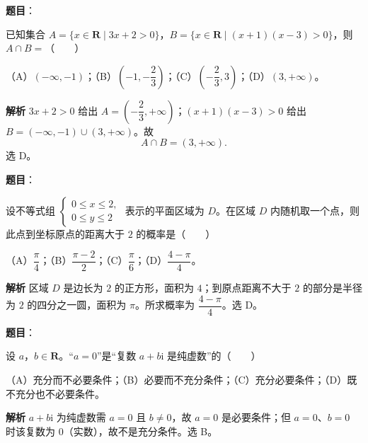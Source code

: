 
\begin{answer}

\textbf{题目}：

已知集合 $A=\{x\in\mathbf R\mid3x+2>0\}$，$B=\{x\in\mathbf R\mid(x+1)(x-3)>0\}$，则 $A\cap B=$\mbox{（　　）}

（A）$(-\infty,-1)$；（B）$\left(-1,-\dfrac23\right)$；（C）$\left(-\dfrac23,3\right)$；（D）$(3,+\infty)$。

\textbf{解析}
$3x+2>0$ 给出 $A=\left(-\dfrac23,+\infty\right)$；$(x+1)(x-3)>0$ 给出 $B=(-\infty,-1)\cup(3,+\infty)$。故
\nopagebreak[4]
\[A\cap B=(3,+\infty).\]
选 D。


\end{answer}
\begin{answer}

\textbf{题目}：

设不等式组 $\begin{cases}0\leqslant x\leqslant2,\\0\leqslant y\leqslant2\end{cases}$ 表示的平面区域为 $D$。在区域 $D$ 内随机取一个点，则此点到坐标原点的距离大于 $2$ 的概率是\mbox{（　　）}

（A）$\dfrac\pi4$；（B）$\dfrac{\pi-2}2$；（C）$\dfrac\pi6$；（D）$\dfrac{4-\pi}4$。

\textbf{解析}
区域 $D$ 是边长为 $2$ 的正方形，面积为 $4$；到原点距离不大于 $2$ 的部分是半径为 $2$ 的四分之一圆，面积为 $\pi$。所求概率为 $\dfrac{4-\pi}4$。选 D。


\end{answer}
\begin{answer}

\textbf{题目}：

设 $a$，$b\in\mathbf R$。“$a=0$”是“复数 $a+b\mathrm i$ 是纯虚数”的\mbox{（　　）}

（A）充分而不必要条件；（B）必要而不充分条件；（C）充分必要条件；（D）既不充分也不必要条件。

\textbf{解析}
$a+b\mathrm i$ 为纯虚数需 $a=0$ 且 $b\neq0$，故 $a=0$ 是必要条件；但 $a=0$、$b=0$ 时该复数为 $0$（实数），故不是充分条件。选 B。


\end{answer}
